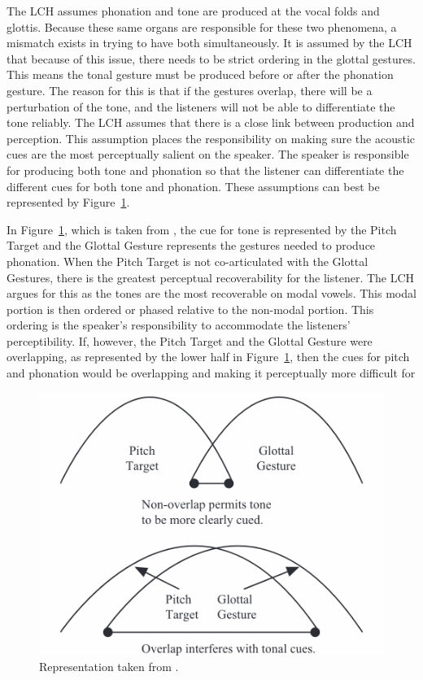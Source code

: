 \documentclass[12pt, letterpaper]{article}
\begin{document}
The LCH assumes phonation and tone are produced at the vocal folds and glottis. Because these same organs are responsible for these two phenomena, a mismatch exists in trying to have both simultaneously. It is assumed by the LCH that because of this issue, there needs to be strict ordering in the glottal gestures. This means the tonal gesture must be produced before or after the phonation gesture. The reason for this is that if the gestures overlap, there will be a perturbation of the tone, and the listeners will not be able to differentiate the tone reliably. The LCH assumes that there is a close link between production and perception. This assumption places the responsibility on making sure the acoustic cues are the most perceptually salient on the speaker. The speaker is responsible for producing both tone and phonation so that the listener can differentiate the different cues for both tone and phonation. These assumptions can best be represented by Figure~\ref{fig:GlottalGestures}. 

In Figure~\ref{fig:GlottalGestures}, which is taken from \citet{dicanioCoarticulationToneGlottal2012}, the cue for tone is represented by the Pitch Target and the Glottal Gesture represents the gestures needed to produce phonation. When the Pitch Target is not co-articulated with the Glottal Gestures, there is the greatest perceptual recoverability for the listener. The LCH argues for this as the tones are the most recoverable on modal vowels. This modal portion is then ordered or phased relative to the non-modal portion. This ordering is the speaker's responsibility to accommodate the listeners' perceptibility. If, however, the Pitch Target and the Glottal Gesture were overlapping, as represented by the lower half in Figure~\ref{fig:GlottalGestures}, then the cues for pitch and phonation would be overlapping and making it perceptually more difficult for 
\begin{figure}[!ht]
	\centering
	\includegraphics[width=.5\textwidth]{Gestures.png}
	\caption{Representation taken from \citet{dicanioCoarticulationToneGlottal2012}.}
	\label{fig:GlottalGestures}
\end{figure}
\end{document}
